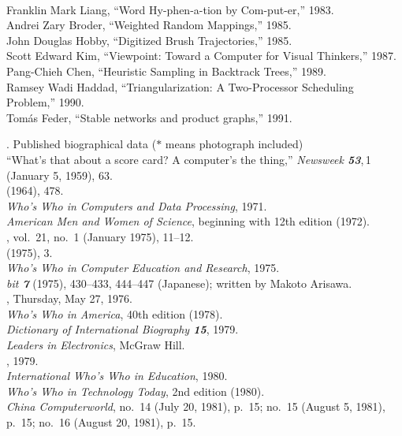 \\Franklin Mark Liang, ``Word Hy-phen-a-tion by Com-put-er,'' 1983.
\\Andrei Zary Broder, ``Weighted Random Mappings,'' 1985.
\\John Douglas Hobby, ``Digitized Brush Trajectories,'' 1985.
\\Scott Edward Kim, ``Viewpoint: Toward a Computer for Visual Thinkers,'' 1987.
\\Pang-Chieh Chen, ``Heuristic Sampling in Backtrack Trees,'' 1989.
\\Ramsey Wadi Haddad, ``Triangularization: A Two-Processor Scheduling
 Problem,'' 1990.
\\Tom\'as Feder, ``Stable networks and product graphs,'' 1991.

. {Published biographical data \rm($\ast$
 means photograph included)}
\\``What's that about a score card? A computer's the thing,'' {\sl Newsweek\/
 \bf53},\,1 (January 5, 1959), 63.
\\ (1964), 478.
\\{\sl Who's Who in Computers and Data Processing}, 1971.
\\{\sl American Men and Women of Science}, beginning with 12th edition (1972).
\\, vol.~21, no.~1 (January 1975), 11--12.
\\ (1975), 3.
\\{\sl Who's Who in Computer Education and Research}, 1975.
\\{\sl bit\/ \bf7} (1975), 430--433, 444--447 (Japanese);
 written by Makoto Arisawa.
\\, Thursday, May 27, 1976.
\\{\sl Who's Who in America}, 40th edition (1978).
\\{\sl Dictionary of International Biography \bf 15}, 1979.
\\{\sl Leaders in Electronics}, McGraw Hill.
\\, 1979.
\\{\sl International Who's Who in Education}, 1980.   
\\{\sl Who's Who in Technology Today}, 2nd edition (1980).
\\{\sl China Computerworld}, no.\ 14 (July 20, 1981), p.\ 15;
 no.\ 15 (August 5, 1981), p.\ 15; no.\ 16 (August 20, 1981), p.\ 15.
